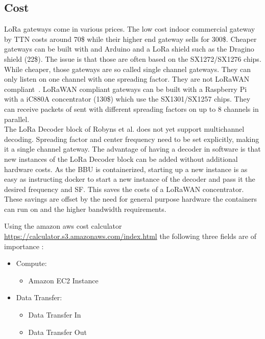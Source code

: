 \subsection{Cost}
LoRa gateways come in various prices. The low cost indoor commercial gateway by TTN costs around 70\$ while their higher end 
gateway sells for 300\$. Cheaper gateways can be built with and Arduino and a LoRa shield such as the Dragino shield (22\$).
The issue is that those are often based on the SX1272/SX1276 chips. While cheaper, those gateways are so called single channel 
gateways. They can only listen on one channel with one spreading factor. They are not LoRaWAN compliant~\cite{single_chan_gate}.
LoRaWAN compliant gateways can be built with a Raspberry Pi with a iC880A concentrator (130\$) which use the SX1301/SX1257 chips. They can receive packets
of sent with different spreading factors on up to 8 channels in parallel.
\\
The LoRa Decoder block of Robyns et al. does not yet support multichannel decoding. Spreading factor and center frequency
need to be set explicitly, making it a single channel gateway. The advantage of having a decoder in software is that new instances 
of the LoRa Decoder block can be added without additional hardware costs. As the BBU is containerized, starting up a new instance 
is as easy as instructing docker to start a new instance of the decoder and pass it the desired frequency and SF. This saves the costs of 
a LoRaWAN concentrator.
These savings are offset by the need for general purpose hardware the containers can run on and the higher bandwidth requirements.

Using the amazon aws cost calculator \url{https://calculator.s3.amazonaws.com/index.html} the following three fields are of importance : 
\begin{itemize}
    \item Compute:
    \begin{itemize}
        \item  Amazon EC2 Instance
    \end{itemize}
    \item  Data Transfer:
    \begin{itemize}
        \item Data Transfer In
        \item Data Transfer Out  
    \end{itemize}
\end{itemize}

